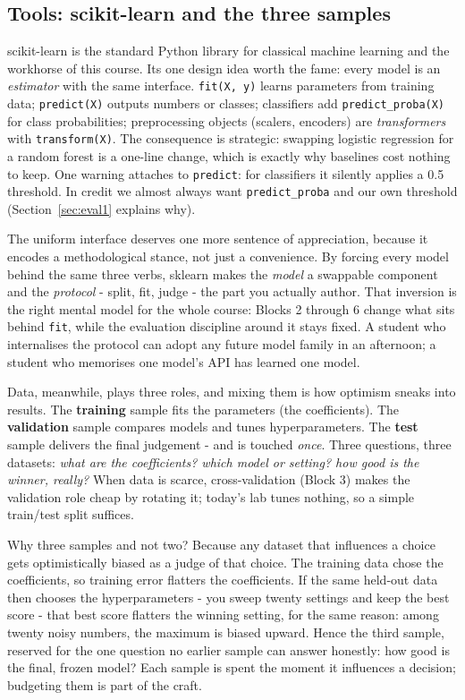 \documentclass[11pt,a4paper]{article}
\begin{document}
\subsection{Tools: scikit-learn and the three samples}
scikit-learn is the standard Python library for classical machine learning
and the workhorse of this course. Its one design idea worth the fame: every
model is an \emph{estimator} with the same interface. \texttt{fit(X, y)}
learns parameters from training data; \texttt{predict(X)} outputs numbers or
classes; classifiers add \texttt{predict\_proba(X)} for class probabilities;
preprocessing objects (scalers, encoders) are \emph{transformers} with
\texttt{transform(X)}. The consequence is strategic: swapping logistic
regression for a random forest is a one-line change, which is exactly why
baselines cost nothing to keep. One warning attaches to \texttt{predict}:
for classifiers it silently applies a 0.5 threshold. In credit we almost
always want \texttt{predict\_proba} and our own threshold
(Section~\ref{sec:eval1} explains why).

The uniform interface deserves one more sentence of appreciation, because
it encodes a methodological stance, not just a convenience. By forcing
every model behind the same three verbs, sklearn makes the \emph{model} a
swappable component and the \emph{protocol} - split, fit, judge - the
part you actually author. That inversion is the right mental model for
the whole course: Blocks 2 through 6 change what sits behind
\texttt{fit}, while the evaluation discipline around it stays fixed. A
student who internalises the protocol can adopt any future model family
in an afternoon; a student who memorises one model's API has learned one
model.

Data, meanwhile, plays three roles, and mixing them is how optimism sneaks
into results. The \textbf{training} sample fits the parameters (the
coefficients). The \textbf{validation} sample compares models and tunes
hyperparameters. The \textbf{test} sample delivers the final judgement -
and is touched \emph{once}. Three questions, three datasets: \emph{what are
the coefficients? which model or setting? how good is the winner, really?}
When data is scarce, cross-validation (Block 3) makes the validation role
cheap by rotating it; today's lab tunes nothing, so a simple train/test
split suffices.

Why three samples and not two? Because any dataset that influences a
choice gets optimistically biased as a judge of that choice. The training
data chose the coefficients, so training error flatters the coefficients.
If the same held-out data then chooses the hyperparameters - you sweep
twenty settings and keep the best score - that best score flatters the
winning setting, for the same reason: among twenty noisy numbers, the
maximum is biased upward. Hence the third sample, reserved for the one
question no earlier sample can answer honestly: how good is the final,
frozen model? Each sample is spent the moment it influences a decision;
budgeting them is part of the craft.
\end{document}
